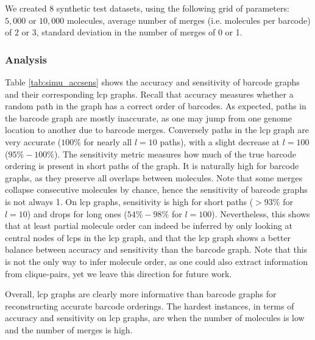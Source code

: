 \documentclass[a4paper,UKenglish,cleveref, autoref, thm-restate,authorcolumns]{lipics-v2019}
\begin{document}

We created 8 synthetic test datasets, using the following grid of parameters: $5,000$ or  $10,000$ molecules, average number of merges (i.e. molecules per barcode) of $2$ or $3$, standard deviation in the number of merges of 0 or 1. %

\subsubsection*{Analysis}

Table \ref{tab:simu_accsens} shows the accuracy and sensitivity of barcode graphs and their corresponding lcp graphs.
Recall that accuracy measures whether a random path in the graph has a correct order of barcodes. As expected, paths in the barcode graph are mostly inaccurate, as one may jump from one genome location to another due to barcode merges. Conversely paths in the lcp graph are very accurate ($100\%$ for nearly all $l=10$ paths), with a slight decrease at $l=100$ ($95\%-100\%$). The sensitivity metric measures how much of the true barcode ordering is present in short paths of the graph. It is naturally high for barcode graphs, as they preserve all overlaps between molecules.
Note that some merges collapse consecutive molecules by chance, hence the sensitivity of barcode graphs is not always 1. On lcp graphs, sensitivity is high for short paths ($>93\%$ for $l=10$) and drops for long ones ($54\%-98\%$ for $l=100$).
Nevertheless, this shows that at least partial molecule order can indeed be inferred by only looking at central nodes of lcps in the lcp graph, and that the lcp graph shows a better balance between accuracy and sensitivity than the barcode graph. Note that this is not the only way to infer molecule order, as one could also extract information from clique-pairs, yet we leave this direction for future work.

Overall, lcp graphs are clearly more informative than barcode graphs for reconstructing accurate barcode orderings. The hardest instances, in terms of accuracy and sensitivity on lcp graphs, are when the number of molecules is low and the number of merges is high. 
\end{document}
